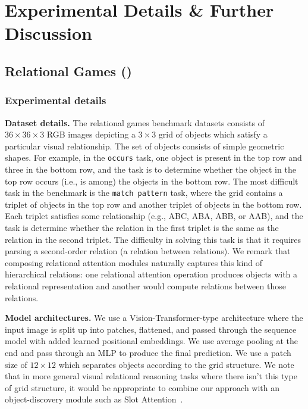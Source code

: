 \section{Experimental Details \& Further Discussion}\label{sec:appendix_experimental_details}

\subsection{Relational Games ()}\label{ssec:appendxi_relgames}

\subsubsection*{Experimental details}

\textbf{Dataset details.} The relational games benchmark datasets consists of $36 \times 36 \times 3$ RGB images depicting a $3 \times 3$ grid of objects which satisfy a particular visual relationship. The set of objects consists of simple geometric shapes. For example, in the \texttt{occurs} task, one object is present in the top row and three in the bottom row, and the task is to determine whether the object in the top row occurs (i.e., is among) the objects in the bottom row. The most difficult task in the benchmark is the \texttt{match pattern} task, where the grid contains a triplet of objects in the top row and another triplet of objects in the bottom row. Each triplet satisfies some relationship (e.g., ABC, ABA, ABB, or AAB), and the task is determine whether the relation in the first triplet is the same as the relation in the second triplet. The difficulty in solving this task is that it requires parsing a second-order relation (a relation between relations). We remark that composing relational attention modules naturally captures this kind of hierarchical relations: one relational attention operation produces objects with a relational representation and another would compute relations between those relations.


\textbf{Model architectures.} We use a Vision-Transformer-type architecture where the input image is split up into patches, flattened, and passed through the sequence model with added learned positional embeddings. We use average pooling at the end and pass through an MLP to produce the final prediction. We use a patch size of $12 \times 12$ which separates objects according to the grid structure. We note that in more general visual relational reasoning tasks where there isn't this type of grid structure, it would be appropriate to combine our approach with an object-discovery module such as Slot Attention~\citep{locatelloObjectCentricLearningSlot2020}.

